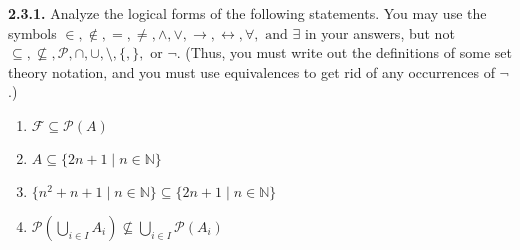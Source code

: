\documentclass[12pt]{amsart}
\newenvironment{statement}[1]{\smallskip\noindent\color[rgb]{.6627, .3529, .6314} {\bf #1.}}{}
\theoremstyle{definition}
\theoremstyle{remark}
\newcommand{\BN}{\mathbb N}
\begin{document}
\begin{statement}{2.3.1}
Analyze the logical forms of the following statements.
You may use the symbols $\in, \notin, =, \neq, \wedge, \vee, \rightarrow, \leftrightarrow,
 \forall, \text{ and } \exists$
in your answers, but not $\subseteq, \nsubseteq, \mathscr{P}, \cap, \cup, \setminus, \{, \},
\text{ or } \neg$.
(Thus, you must write out the definitions of some set theory notation, and you must use
equivalences to get rid of any occurrences of $\neg$.)
\begin{enumerate}
	\item $\mathcal{F} \subseteq \mathscr{P}(A)$
	
	\item $A \subseteq \{ 2n + 1 \mid n \in \BN \}$
	
	\item $\{ n^2 + n + 1 \mid n \in \BN \} \subseteq \{ 2n + 1 \mid n \in \BN \}$
	
	\item $\mathscr{P} \left( \bigcup_{i \in I} A_i \right) 
	\nsubseteq \bigcup_{i \in I} \mathscr{P}(A_i)$
\end{enumerate}
\end{statement}
\end{document}

